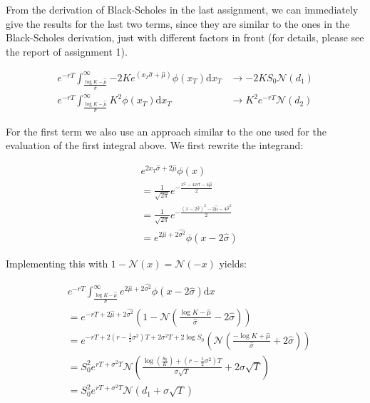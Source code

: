 \documentclass[11pt,a4paper]{article}
\begin{document}
From the derivation of Black-Scholes in the last assignment, we can immediately give the results for the last two terms, since they are similar to the ones in the Black-Scholes derivation, just with different factors in front (for details, please see the report of assignment 1).

\begin{align}
  e^{-rT}\int_{\frac{\log K -\hat{\mu}}{\hat{\sigma}}}^{\infty}{-2Ke^{(x_T\hat{\sigma}+\hat{\mu})}\phi(x_T)}\mathrm{d}x_T &\rightarrow -2KS_0\mathcal{N}(d_1) \nonumber \\
  e^{-rT}\int_{\frac{\log K -\hat{\mu}}{\hat{\sigma}}}^{\infty}{K^2\phi(x_T)}\mathrm{d}x_T &\rightarrow K^2e^{-rT}\mathcal{N}(d_2)
\end{align}

For the first term we also use an approach similar to the one used for the evaluation of the first integral above. We first rewrite the integrand:

\begin{align}
  &e^{2x_T\hat{\sigma}+2\hat{\mu}}\phi(x) \nonumber \\
  & =\frac{1}{\sqrt{2\pi}}e^{-\frac{x^2-4x\hat{\sigma}-4\hat{\mu}}{2}} \nonumber \\
  & =\frac{1}{\sqrt{2\pi}}e^{-\frac{(x-2\hat{\sigma})^2-2\hat{\mu}-4\hat{\sigma}^2}{2}} \nonumber \\
  & =e^{2\hat{\mu}+2\hat{\sigma^2}}\phi(x-2\hat{\sigma})  
\end{align}

Implementing this with $1-\mathcal{N}(x)=\mathcal{N}(-x)$ yields:

\begin{align}
&e^{-rT}\int_{\frac{\log K -\hat{\mu}}{\hat{\sigma}}}^{\infty}{e^{2\hat{\mu}+2\hat{\sigma^2}}\phi(x-2\hat{\sigma})}\mathrm{d}x \nonumber \\
& = e^{-rT+2\hat{\mu}+2\hat{\sigma^2}}\left(1-\mathcal{N}\left(\frac{\log K -\hat{\mu}}{\hat{\sigma}}-2\hat{\sigma}\right)\right) \nonumber \\
& = e^{-rT+2\left(r-\frac{1}{2}\sigma^2\right)T+2\sigma^2T+2\log S_0}\left(\mathcal{N}\left(\frac{-\log K +\hat{\mu}}{\hat{\sigma}}+2\hat{\sigma}\right)\right) \nonumber \\
& = S_0^2e^{rT+\sigma^2T}\mathcal{N}\left(\frac{\log\left(\frac{S_0}{K}\right)+\left(r-\frac{1}{2}\sigma^2\right)T}{\sigma\sqrt{T}}+2\sigma\sqrt{T}\right) \nonumber \\
& = S_0^2e^{rT+\sigma^2T}\mathcal{N}(d_1+\sigma \sqrt{T})
\end{align}
\end{document}
